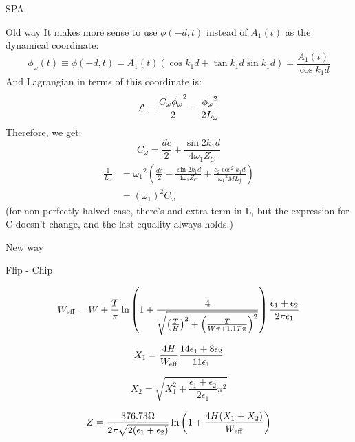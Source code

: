 \documentclass[12pt,a4paper]{article}
\begin{document}
\begin{section}{SPA}
\begin{subsection}{Old way}
It makes more sense to use $\phi(-d, t)$ instead of $A_1(t)$ as the dynamical coordinate: 
\begin{equation}
\phi_\omega(t) \equiv \phi(-d, t) = A_1(t) ( \cos k_1 d + \tan k_1 d \sin k_1 d) = \frac{A_1(t)}{\cos k_1 d}
\end{equation}
And Lagrangian in terms of this coordinate is: 
\begin{equation}
\mathcal{L} \equiv \frac{C_\omega \dot{\phi_\omega}^2}{2} - \frac{{\phi_\omega}^2}{2L_\omega}
\end{equation}
Therefore, we get: 
\begin{equation}\label{eq:C_omega}
C_\omega = \frac{dc}{2} + \frac{\sin 2 k_1 d}{4 \omega_1 Z_C}
\end{equation}
\begin{equation}\label{eq:L_omega}
\begin{aligned}
\frac{1}{L_\omega} &= {\omega_1}^2 \left(\frac{dc}{2} - \frac{\sin 2 k_1 d}{4 \omega_1 Z_C} + \frac{c_2 \cos^2 k_1 d}{{\omega_1}^2ML_j} \right)\\
&=(\omega_1)^2 C_\omega
\end{aligned}
\end{equation}
(for non-perfectly halved case, there's and extra term in L, but the expression for C doesn't change, and the last equality always holds.)


\end{subsection}

\begin{subsection}{New way}
\end{subsection}

\end{section}




\begin{section}{Flip - Chip}

\begin{equation}
W_{\mathrm{eff}} = W + \frac{T}{\pi} \ln \left(1+ \frac{4}{\sqrt{\left(\frac{T}{H}\right)^2+\left(\frac{T}{W\pi + 1.1T \pi}\right)^2}}\right) \frac{\epsilon_1+\epsilon_2}{2 \pi \epsilon_1}
\end{equation}

\begin{equation}
X_1 = \frac{4H}{W_{\mathrm{eff}}} \frac{14\epsilon_1 + 8\epsilon_2}{11\epsilon_1}
\end{equation}

\begin{equation}
X_2 = \sqrt{X_1^2 + \frac{\epsilon_1+\epsilon_2}{2\epsilon_1}\pi^2}
\end{equation}

\begin{equation}
Z = \frac{376.73\Omega}{2\pi\sqrt{2(\epsilon_1 + \epsilon_2)}}\ln\left(1+ \frac{4H(X_1+X_2)}{W_{\mathrm{eff}}}\right)
\end{equation}


\end{section}
\end{document}
